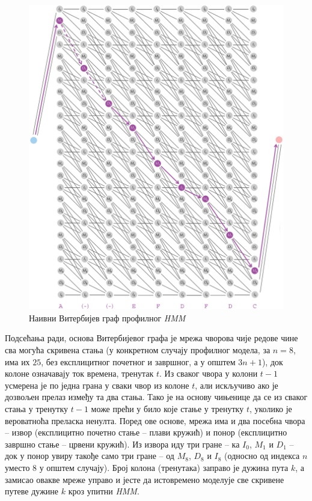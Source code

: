 \documentclass[12pt,oneside]{memoir}
\begin{document}
\begin{CJK}{UTF8}{ipxm}
\begin{figure}[H]
  \centering
  \includegraphics[width=\textwidth]{prof_vit.png}
  \caption{Наивни Витербијев граф профилног \textit{HMM} \cite{compeau2015}}
  \label{fig:prof_vit}
\end{figure}

Подсећања ради, основа Витербијевог графа је мрежа чворова чије редове чине сва могућа скривена стања (у конкретном случају профилног модела, за $n = 8$, има их $25$, без експлицитног почетног и завршног, а у општем $3n+1$), док колоне означавају ток времена, тренутак $t$. Из сваког чвора у колони $t-1$ усмерена је по једна грана у сваки чвор из колоне $t$, али искључиво ако је дозвољен прелаз између та два стања. Тако је на основу чињенице да се из сваког стања у тренутку $t-1$ може прећи у било које стање у тренутку $t$, уколико је вероватноћа преласка ненулта. Поред ове основе, мрежа има и два посебна чвора -- извор (експлицитно почетно стање -- плави кружић) и понор (експлицитно завршно стање -- црвени кружић). Из извора иду три гране -- ка $I_0$, $M_1$ и $D_1$ -- док у понор увиру такође само три гране -- од $M_8$, $D_8$ и $I_8$ (односно од индекса $n$ уместо $8$ у општем случају). Број колона (тренутака) заправо је дужина пута $k$, а замисао овакве мреже управо и јесте да истовремено моделује све скривене путеве дужине $k$ кроз упитни \textit{HMM}.


\end{CJK}
\end{document}
